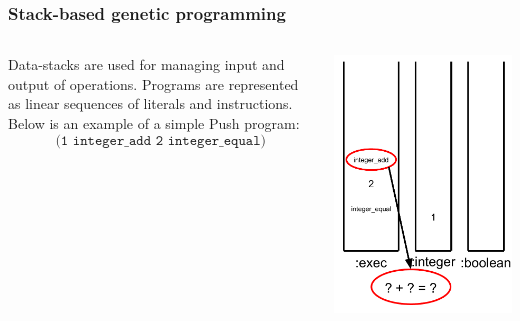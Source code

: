 \documentclass{beamer}
\newcommand{\linespace}{\vskip 0.25cm}
\begin{document}
\begin{frame}
	\frametitle{Stack-based genetic programming}
	\begin{columns}
		\begin{column}{0.65\textwidth}
			Data-stacks are used for managing input and output of operations.
			\linespace
			\linespace
			\linespace
			Programs are represented as linear sequences of literals and instructions. Below is an example of a simple Push program:
			\[\texttt{(1 integer\_add 2 integer\_equal)}\]
		\end{column}
		\begin{column}{0.35\textwidth}
			\includegraphics[height=.7\textheight]{Illustrations/stack_3_5.PDF}
		\end{column}
	\end{columns}
\end{frame}
\end{document}
